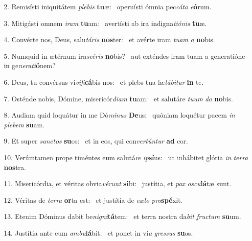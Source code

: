2. Remisísti iniquitátem \textit{ple}\textit{bis} \textbf{tu}æ: \ast\  operuísti ómnia pec\textit{cá}\textit{ta} \textit{e}\textbf{ó}rum.\

3. Mitigásti omnem \textit{i}\textit{ram} \textbf{tu}am: \ast\  avertísti ab ira indigna\textit{ti}\textit{ó}\textit{nis} \textbf{tu}æ.\

4. Convérte nos, Deus, salu\textit{tá}\textit{ris} \textbf{nos}ter: \ast\  et avérte iram \textit{tu}\textit{am} \textit{a} \textbf{no}bis.\

5. Numquid in ætérnum ira\textit{scé}\textit{ris} \textbf{no}bis? \ast\  aut exténdes iram tuam a generatióne in ge\textit{ne}\textit{ra}\textit{ti}\textbf{ó}nem?\

6. Deus, tu convérsus vi\textit{vi}\textit{fi}\textbf{cá}bis nos: \ast\  et plebs tua læ\textit{tá}\textit{bi}\textit{tur} \textbf{in} te.\

7. Osténde nobis, Dómine, misericór\textit{di}\textit{am} \textbf{tu}am: \ast\  et salutáre \textit{tu}\textit{um} \textit{da} \textbf{no}bis.\

8. Audiam quid loquátur in me Dó\textit{mi}\textit{nus} \textbf{De}us: \ast\  quóniam loquétur pacem \textit{in} \textit{ple}\textit{bem} \textbf{su}am.\

9. Et super \textit{sanc}\textit{tos} \textbf{su}os: \ast\  et in eos, qui con\textit{ver}\textit{tún}\textit{tur} \textbf{ad} cor.\

10. Verúmtamen prope timéntes eum salutá\textit{re} \textit{ip}\textbf{sí}us: \ast\  ut inhábitet glória \textit{in} \textit{ter}\textit{ra} \textbf{nos}tra.\

11. Misericórdia, et véritas obvia\textit{vé}\textit{runt} \textbf{si}bi: \ast\  justítia, et \textit{pax} \textit{os}\textit{cu}\textbf{lá}tæ sunt.\

12. Véritas de \textit{ter}\textit{ra} \textbf{or}ta est: \ast\  et justítia de \textit{cæ}\textit{lo} \textit{pro}\textbf{spé}xit.\

13. Etenim Dóminus dabit be\textit{ni}\textit{gni}\textbf{tá}tem: \ast\  et terra nostra da\textit{bit} \textit{fruc}\textit{tum} \textbf{su}um.\

14. Justítia ante eum \textit{am}\textit{bu}\textbf{lá}bit: \ast\  et ponet in vi\textit{a} \textit{gres}\textit{sus} \textbf{su}os.\


